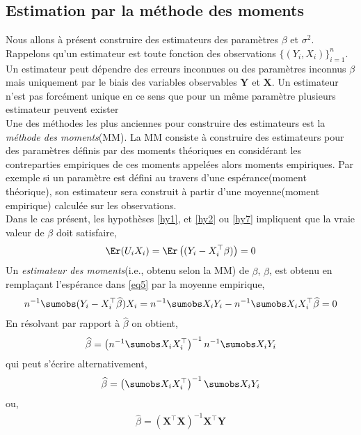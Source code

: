 \subsection{Estimation par la méthode des moments}
Nous allons à présent construire des estimateurs des paramètres $\beta$ et $\sigma^2$. Rappelons qu'un estimateur est toute fonction des observations $\{(Y_i, X_i)\}_{i=1}^n$. Un estimateur peut dépendre des erreurs inconnues ou des paramètres inconnus $\beta$ mais uniquement par le biais des variables observables $\mathbf{Y}$ et $\mathbf{X}$. Un estimateur n'est pas forcément unique en ce sens que pour un même paramètre plusieurs estimateur peuvent exister\\
Une des méthodes les plus anciennes pour construire des estimateurs est la \emph{méthode des moments}(MM). La MM consiste à construire des estimateurs pour des paramètres définis par des moments théoriques en considérant les contreparties empiriques de ces moments appelées alors moments empiriques. Par exemple si un paramètre est défini au travers d'une espérance(moment théorique), son  estimateur sera construit à partir d'une moyenne(moment empirique) calculée sur les observations.\\
Dans le cas présent, les hypothèses \ref{hy1}, et \ref{hy2} ou \ref{hy7} impliquent que la vraie valeur de $\beta$ doit satisfaire,
\begin{align}
\Er(U_iX_i) = \Er\left((Y_i-X_i^\top\beta)\right) = 0
\label{eq5}
\end{align}
 Un \emph{estimateur des moments}(i.e., obtenu selon la MM) de $\beta$, $\widehat{\beta}$,  est obtenu en remplaçant l'espérance dans \eqref{eq5} par la moyenne empirique,
\begin{align}
n^{-1}\sumobs(Y_i - X_i^\top\widehat{\beta})X_i = n^{-1}\sumobs X_iY_i - n^{-1}\sumobs X_iX_i^\top\widehat{\beta} = 0
\label{eq6}
\end{align}
En résolvant par rapport à $\widehat{\beta}$ on obtient,
\begin{align}
\widehat{\beta} = \left(n^{-1}\sumobs X_iX_i^\top\right)^{-1}n^{-1}\sumobs X_iY_i
\label{eq7}
\end{align}
qui peut s'écrire alternativement,
\begin{align}
\widehat{\beta} = \left(\sumobs X_iX_i^\top\right)^{-1}\sumobs X_iY_i
\label{eq8}
\end{align}
ou,
\begin{align}
\widehat{\beta} = \left(\mathbf{X}^\top\mathbf{X}\right)^{-1}\mathbf{X}^\top\mathbf{Y}
\label{eq9}
\end{align}

